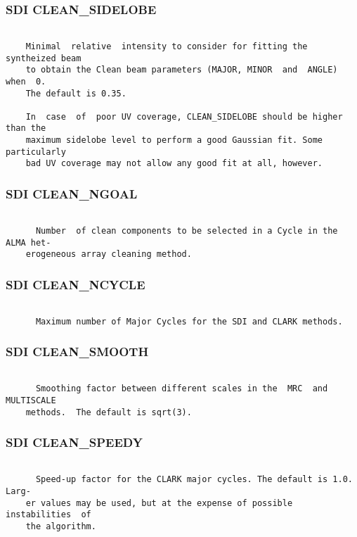 \subsubsection{SDI CLEAN\_SIDELOBE}
\begin{verbatim}

    Minimal  relative  intensity to consider for fitting the syntheized beam
    to obtain the Clean beam parameters (MAJOR, MINOR  and  ANGLE)  when  0.
    The default is 0.35.

    In  case  of  poor UV coverage, CLEAN_SIDELOBE should be higher than the
    maximum sidelobe level to perform a good Gaussian fit. Some particularly
    bad UV coverage may not allow any good fit at all, however.

\end{verbatim}
\subsubsection{SDI CLEAN\_NGOAL}
\begin{verbatim}

      Number  of clean components to be selected in a Cycle in the ALMA het-
    erogeneous array cleaning method.

\end{verbatim}
\subsubsection{SDI CLEAN\_NCYCLE}
\begin{verbatim}

      Maximum number of Major Cycles for the SDI and CLARK methods.

\end{verbatim}
\subsubsection{SDI CLEAN\_SMOOTH}
\begin{verbatim}

      Smoothing factor between different scales in the  MRC  and  MULTISCALE
    methods.  The default is sqrt(3).

\end{verbatim}
\subsubsection{SDI CLEAN\_SPEEDY}
\begin{verbatim}

      Speed-up factor for the CLARK major cycles. The default is 1.0.  Larg-
    er values may be used, but at the expense of possible  instabilities  of
    the algorithm.

\end{verbatim}
